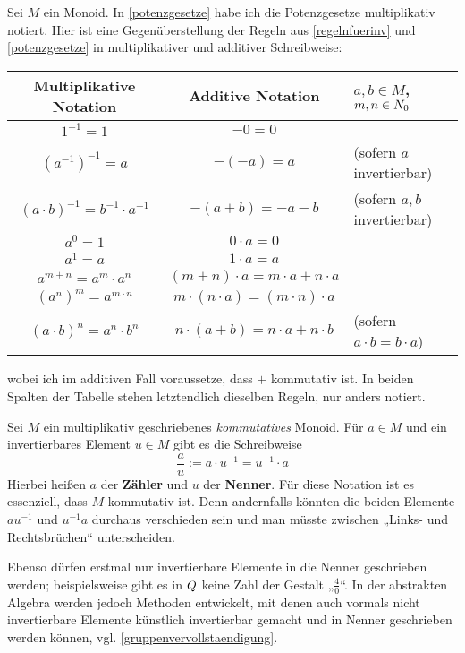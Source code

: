 \begin{bem}[*] \label{brueche}
    Sei $M$ ein Monoid. In \cref{potenzgesetze} habe ich die Potenzgesetze multiplikativ notiert. Hier ist eine Gegenüberstellung der Regeln aus \cref{regelnfuerinv} und \cref{potenzgesetze} in multiplikativer und additiver Schreibweise:
    \begin{center}
    \begin{tabular}{ccl}
        Multiplikative Notation & Additive Notation & $a,b\in M$,\ $m,n\in \relax N_0$\\
        \midrule
        $1^{-1} = 1$ & $-0=0$ & \\
        $(a^{-1})^{-1} = a$ & $-(-a)=a$ & (sofern $a$ invertierbar) \\
        $(a\cdot b)^{-1} = b^{-1}\cdot a^{-1}$ & $-(a+b) = -a - b$ & (sofern $a,b$ invertierbar) \\
        $a^0 = 1$ & $0\cdot a = 0$ & \\
        $a^1 = a$ & $1\cdot a=a$ &\\
        $a^{m+n} = a^m\cdot a^n$ & $(m+n)\cdot a = m\cdot a + n\cdot a$ & \\
        $(a^n)^m = a^{m\cdot n}$ & $m\cdot (n\cdot a) = (m\cdot n)\cdot a$ & \\
        $(a\cdot b)^n =a^n\cdot b^n$ & $n\cdot (a+b) = n\cdot a+n\cdot b$ & (sofern $a\cdot b=b\cdot a$)
    \end{tabular}
    \end{center}
    wobei ich im additiven Fall voraussetze, dass $+$ kommutativ ist. In beiden Spalten der Tabelle stehen letztendlich dieselben Regeln, nur anders notiert.
\end{bem}


\begin{nota}[* Bruchschreibweise]  
    Sei $M$ ein multiplikativ geschriebenes \emph{kommutatives} Monoid. Für $a\in M$ und ein invertierbares Element $u\in M$ gibt es die Schreibweise
        \[ \frac{a}{u} := a\cdot u^{-1} = u^{-1} \cdot a\]
    Hierbei heißen $a$ der \textbf{Zähler} und $u$ der \textbf{Nenner}. Für diese Notation ist es essenziell, dass $M$ kommutativ ist. Denn andernfalls könnten die beiden Elemente $au^{-1}$ und $u^{-1}a$ durchaus verschieden sein und man müsste zwischen „Links- und Rechtsbrüchen“ unterscheiden.
    
    Ebenso dürfen erstmal nur invertierbare Elemente in die Nenner geschrieben werden; beispielsweise gibt es in $\relax Q$ keine Zahl der Gestalt „$\frac{4}{0}$“. In der abstrakten Algebra werden jedoch Methoden entwickelt, mit denen auch vormals nicht invertierbare Elemente künstlich invertierbar gemacht und in Nenner geschrieben werden können, vgl. \cref{gruppenvervollstaendigung}.
\end{nota}


